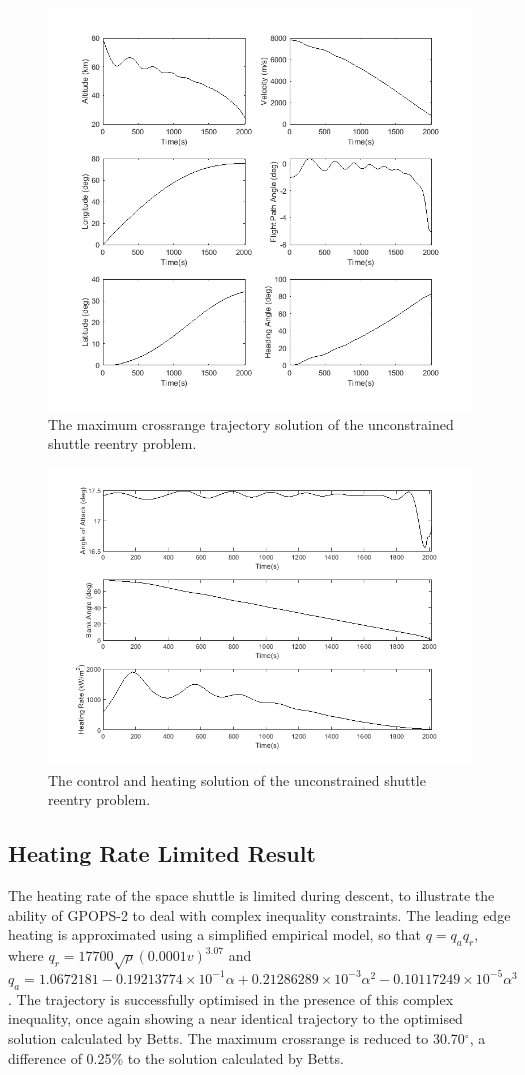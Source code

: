 \begin{figure}[H]
\centering
\includegraphics[width=0.7\linewidth]{figures/A1_uncertainty-analysis/SpaceShuttleNoq1}
\caption{The maximum crossrange trajectory solution of the unconstrained shuttle reentry problem.}
\label{fig:SpaceShuttleNoq1}
\end{figure}
\begin{figure}[H]
\centering
\includegraphics[width=0.7\linewidth]{figures/A1_uncertainty-analysis/SpaceShuttleNoq2}
\caption{The control and heating solution of the unconstrained shuttle reentry problem.}
\label{fig:SpaceShuttleNoq2}
\end{figure}


\subsection{Heating Rate Limited Result}
The heating rate of the space shuttle is limited during descent, to illustrate the ability of GPOPS-2 to deal with complex inequality constraints. The leading edge heating is approximated using a simplified empirical model, so that $q = q_aq_r$, where $q_r = 17700\sqrt{\rho}(0.0001v)^{3.07}$ and $q_a = 1.0672181 -0.19213774\times10^{-1}
\alpha + 0.21286289\times10^{-3}\alpha^2 -0.10117249\times10^{-5}\alpha^3$. The trajectory is successfully optimised in the presence of this complex inequality, once again showing a near identical trajectory to the optimised solution calculated by Betts\cite{Betts2009}. The maximum crossrange is reduced to 30.70$^\circ$, a difference of 0.25\% to the solution calculated by Betts\cite{Betts2009}.

